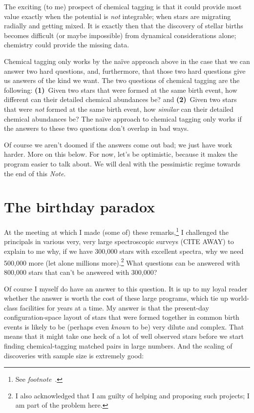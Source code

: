 \documentclass[11pt, letterpaper]{article}
\newcommand{\documentname}{\textsl{Note}}
\newcommand{\footnotename}[1]{\textsl{footnote}~\footnotemark[\ref{#1}]}
\begin{document}
The exciting (to me) prospect of chemical tagging is that it could
provide most value exactly when the potential is \emph{not}
integrable; when stars are migrating radially and getting mixed.
It is exactly then that the discovery of stellar births becomes
difficult (or maybe impossible) from dynamical considerations alone;
chemistry could provide the missing data.

Chemical tagging only works by the na\"ive approach above in the case that we can
answer two hard questions, and, furthermore, that those two hard
questions give us answers of the kind we want. The two questions of
chemical tagging are the following: \textbf{(1)}~Given two stars that
were formed at the same birth event, how different can their detailed
chemical abundances be? and \textbf{(2)}~Given two stars that were
\emph{not} formed at the same birth event, how \emph{similar} can
their detailed chemical abundances be? The na\"ive approach to
chemical tagging only works if the answers to these two questions
don't overlap in bad ways.

Of course we aren't doomed if the answers come out bad; we just have
work harder. More on this below. For now, let's be optimistic, because
it makes the program easier to talk about. We will deal with the
pessimistic regime towards the end of this \documentname.

\section{The birthday paradox}

At the meeting at which I made (some of) these remarks,\footnote{See
  \footnotename{foot:conference}.} I challenged the principals in
various very, very large spectroscopic surveys (CITE AWAY) to explain
to me why, if we have 300,000 stars with excellent spectra, why we
need 500,000 more (let alone millions more).\footnote{I also
  acknowledged that I am guilty of helping and proposing such
  projects; I am part of the problem here.} What questions can be
answered with 800,000 stars that can't be answered with 300,000? 

Of course I myself do have an answer to this question. It is up to my
loyal reader whether the answer is worth the cost of these large
programs, which tie up world-class facilities for years at a time.  My
answer is that the present-day configuration-space layout of stars
that were formed together in common birth events is likely to be
(perhaps even \emph{known} to be) very dilute and complex. That means
that it might take one heck of a lot of well observed stars before we
start finding chemical-tagging matched pairs in large numbers. And the
scaling of discoveries with sample size is extremely good:
\end{document}
